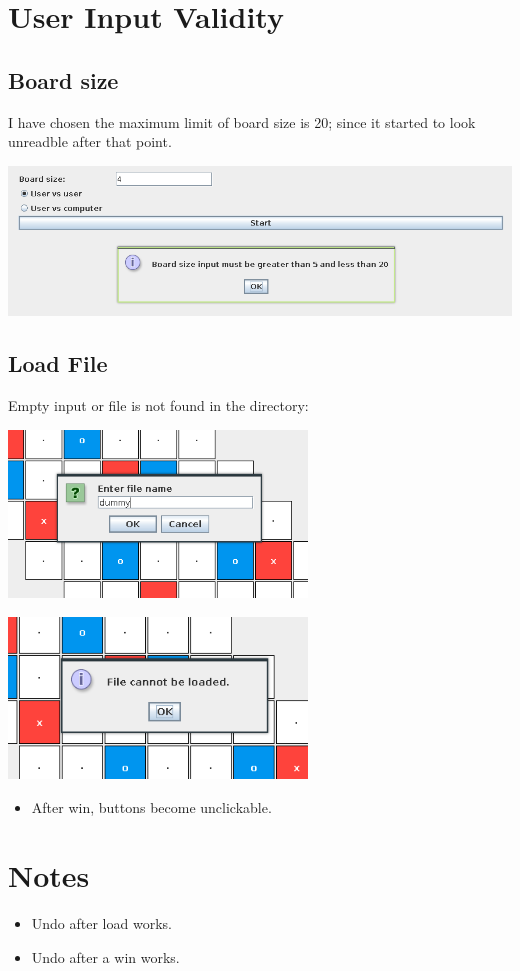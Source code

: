 \documentclass[11pt]{article}
\begin{document}
\section{User Input Validity}
\label{sec:orga9a33b0}

\subsection{Board size}
\label{sec:orgcc3b2a5}
I have chosen the maximum limit of board size is 20; since it started to look unreadble after that point.

\begin{center}
\includegraphics[width=.9\linewidth]{User_Input_Validity/2021-01-29_14-50-22_screenshot.png}
\end{center}

\subsection{Load File}
\label{sec:orgf8ee42d}
Empty input or file is not found in the directory:

\begin{center}
\includegraphics[width=300px]{User_Input_Validity/2021-01-29_14-55-39_screenshot.png}
\end{center}
\begin{center}
\includegraphics[width=300px]{User_Input_Validity/2021-01-29_14-56-01_screenshot.png}
\end{center}

\begin{itemize}
\item After win, buttons become unclickable.
\end{itemize}

\section{Notes}
\label{sec:org15936b9}

\begin{itemize}
\item Undo after load works.
\item Undo after a win works.
\end{itemize}
\end{document}
